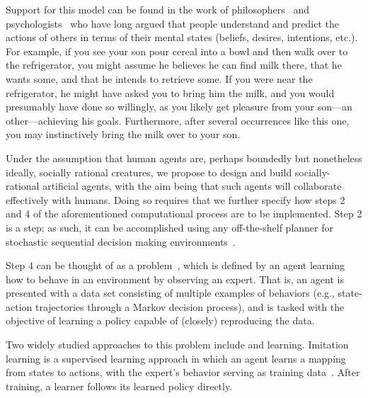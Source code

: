 
Support for this model can be found in the work of
philosophers~\cite{dennett87} and psychologists~\cite{heider44} who
have long argued that people understand and predict the actions of
others in terms of their  mental states (beliefs, desires, intentions,
etc.).  For example, if you see your son pour cereal into a bowl and
then walk over to the refrigerator, you might assume he believes he can find milk there,
that he wants some, and that he intends to retrieve some.  If you were near the refrigerator, he
might have asked you to bring him the milk, and you would presumably
have done so willingly, as you likely get pleasure from your son---an
other---achieving his goals.  Furthermore, after several occurrences
like this one, you may instinctively bring the milk over to your son.

Under the assumption that human agents are, perhaps boundedly but
nonetheless ideally, socially rational creatures, we propose to design
and build socially-rational artificial agents, with the aim being that
such agents will collaborate effectively with humans.  Doing so
requires that we further specify how steps 2 and 4 of the
aforementioned computational process are to be implemented.  Step 2 is
a  step; as such, it can be accomplished using any
off-the-shelf planner for stochastic sequential decision making
environments~\cite{Barto95,bellman57,boutilier99,collins95,kearns99b,kocsis06}.

Step 4 can be thought of as a 
problem~\cite{argall09}, which is defined by an agent learning how to
behave in an environment by observing an expert.  That is, an agent is
presented with a data set consisting of multiple examples of behaviors
(e.g., state-action trajectories through a Markov decision process),
and is tasked with the objective of learning a policy capable of
(closely) reproducing the data.

Two widely studied approaches to this problem include
 and  learning.  Imitation learning
is a supervised learning approach in which an agent learns a mapping
from states to actions, with the expert's behavior serving as training
data~\cite{pomerleau93}.  After training, a learner follows its
learned policy directly.

